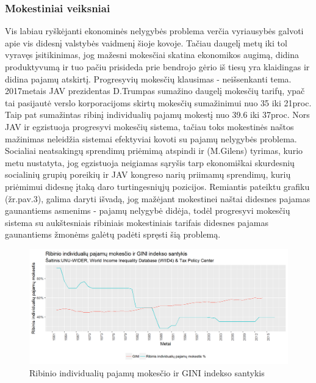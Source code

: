\documentclass[12pt,a4paper,titlepage]{article}
\begin{document}
\subsubsection{Mokestiniai veiksniai}
Vis labiau ryškėjanti ekonominės nelygybės problema verčia vyriausybės galvoti apie vis didesnį valstybės vaidmenį šioje kovoje. Tačiau daugelį metų iki tol vyravęs įsitikinimas, jog mažesni mokesčiai skatina ekonomikos augimą, didina produktyvumą ir tuo pačiu prisideda prie bendrojo gėrio iš tiesų yra klaidingas ir didina pajamų atskirtį. Progresyvių mokesčių klausimas - neišsenkanti tema. 2017metais JAV prezidentas D.Trumpas sumažino daugelį mokesčių tarifų, ypač tai pasijautė verslo korporacijoms skirtų mokesčių sumažinimui nuo 35 iki 21proc. Taip pat sumažintas ribinį individualių pajamų mokestį nuo 39.6 iki 37proc. Nors JAV ir egzistuoja progresyvi mokesčių sistema, tačiau toks mokestinės naštos mažinimas neleidžia sistemai efektyviai kovoti su pajamų nelygybės problema. Socialiai neatsakingų sprendimų priėmimą atspindi ir (M.Gilens) tyrimas, kurio metu nustatyta, jog egzistuoja neigiamas sąryšis tarp ekonomiškai skurdesnių socialinių grupių poreikių ir JAV kongreso narių priimamų sprendimų, kurių priėmimui didesnę įtaką daro turtingesniųjų pozicijos.
Remiantis pateiktu grafiku (žr.pav.3), galima daryti išvadą, jog mažėjant mokestinei naštai didesnes pajamas gaunantiems asmenims - pajamų nelygybė didėja, todėl progresyvi mokesčių sistema su aukštesniais ribiniais mokestiniais tarifais didesnes pajamas gaunantiems žmonėms galėtų padėti spręsti šią problemą. 
\begin{figure}[H]
\includegraphics[scale=0.7]{ginivsmarginaltax.png}
\caption{Ribinio individualių pajamų mokesčio ir GINI indekso santykis}
\end{figure}
\end{document}
